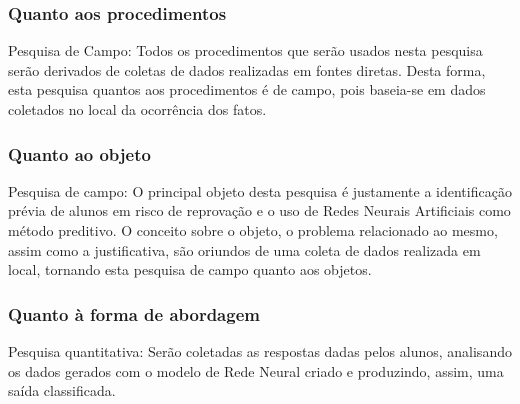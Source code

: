 \documentclass[
	12pt,				%
	openright,			%
	oneside,
	a4paper,			%
	english,			%
	french,				%
	spanish,			%
	brazil,				%
	]{abntex2}
\begin{document}
\subsubsection{Quanto aos procedimentos}
Pesquisa de Campo: Todos os procedimentos que serão usados nesta pesquisa serão derivados de coletas de dados realizadas em fontes diretas. Desta forma, esta pesquisa quantos aos procedimentos é de campo, pois baseia-se em dados coletados no local da ocorrência dos fatos.

\subsubsection{Quanto ao objeto}
Pesquisa de campo: O principal objeto desta pesquisa é justamente a identificação prévia de alunos em risco de reprovação e o uso de Redes Neurais Artificiais como método preditivo. O conceito sobre o objeto, o problema relacionado ao mesmo, assim como a justificativa, são oriundos de uma coleta de dados realizada em local, tornando esta pesquisa de campo quanto aos objetos.

\subsubsection{Quanto à forma de abordagem}
Pesquisa quantitativa: Serão coletadas as respostas dadas pelos alunos, analisando os dados gerados com o modelo de Rede Neural criado e produzindo, assim, uma saída classificada.
\end{document}
